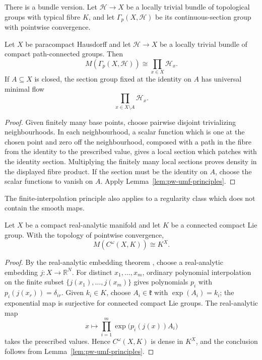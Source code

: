 There is a bundle version. Let \(\mathcal H\to X\) be a locally trivial bundle
of topological groups with typical fibre \(K\), and let
\(\Gamma_p(X,\mathcal H)\) be its continuous-section group with pointwise
convergence.

\begin{corollary}\label{cor:pw-topological-section-umf}
Let \(X\) be paracompact Hausdorff and let \(\mathcal H\to X\) be a locally
trivial bundle of compact path-connected groups. Then
\[
M(\Gamma_p(X,\mathcal H))
 \cong\prod_{x\in X}\mathcal H_x.
\]
If \(A\subseteq X\) is closed, the section group fixed at the identity on
\(A\) has universal minimal flow
\[
\prod_{x\in X\setminus A}\mathcal H_x.
\]
\end{corollary}

\begin{proof}
Given finitely many base points, choose pairwise disjoint trivializing
neighbourhoods. In each neighbourhood, a scalar function which is one at the
chosen point and zero off the neighbourhood, composed with a path in the fibre
from the identity to the prescribed value, gives a local section which patches
with the identity section. Multiplying the finitely many local sections proves
density in the displayed fibre product. If the section must be the identity on
\(A\), choose the scalar functions to vanish on \(A\). Apply
Lemma~\ref{lem:pw-umf-principles}.
\end{proof}

The finite-interpolation principle also applies to a regularity class which
does not contain the smooth maps.

\begin{corollary}\label{cor:pw-analytic-mapping-umf}
Let \(X\) be a compact real-analytic manifold and let \(K\) be a connected
compact Lie group. With the topology of pointwise convergence,
\[
M(C^\omega(X,K))\cong K^X.
\]
\end{corollary}

\begin{proof}
By the real-analytic embedding theorem \cite{Grauert1958}, choose a real-analytic
embedding \(j:X\to\mathbb R^N\). For distinct
\(x_1,\ldots,x_m\), ordinary polynomial interpolation on the finite subset
\(\{j(x_1),\ldots,j(x_m)\}\) gives polynomials \(p_i\) with
\(p_i(j(x_r))=\delta_{ir}\). Given \(k_i\in K\), choose
\(A_i\in\mathfrak k\) with \(\exp(A_i)=k_i\); the exponential map is
surjective for connected compact Lie groups. The real-analytic map
\[
x\longmapsto\prod_{i=1}^m
 \exp\bigl(p_i(j(x))A_i\bigr)
\]
takes the prescribed values. Hence \(C^\omega(X,K)\) is dense in \(K^X\),
and the conclusion follows from Lemma~\ref{lem:pw-umf-principles}.
\end{proof}

